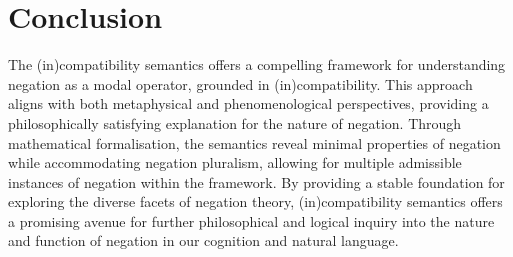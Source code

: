 \section{Conclusion}

The (in)compatibility semantics offers a compelling framework for understanding negation as a modal operator, grounded in (in)compatibility. This approach aligns with both metaphysical and phenomenological perspectives, providing a philosophically satisfying explanation for the nature of negation. Through mathematical formalisation, the semantics reveal minimal properties of negation while accommodating negation pluralism, allowing for multiple admissible instances of negation within the framework. By providing a stable foundation for exploring the diverse facets of negation theory, (in)compatibility semantics offers a promising avenue for further philosophical and logical inquiry into the nature and function of negation in our cognition and natural language.
